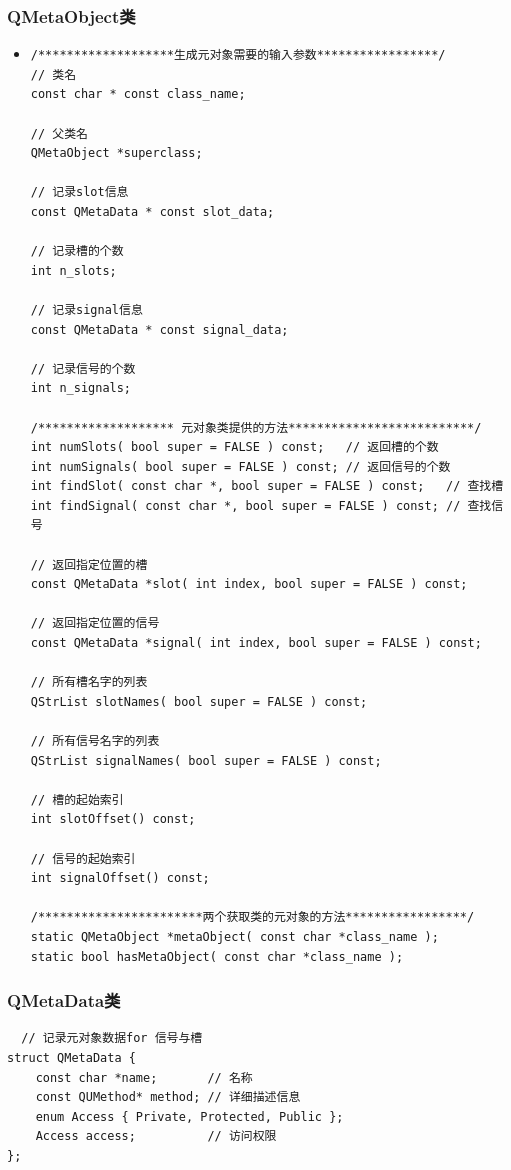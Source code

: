 \documentclass[9pt,b5paper]{article}
\begin{document}
\subsubsection{QMetaObject类}
\label{sec-4-1-1}
\begin{itemize}
\item \lstset{language=java,label= ,caption= ,numbers=none}
\begin{lstlisting}
/*******************生成元对象需要的输入参数*****************/  
// 类名  
const char * const class_name;  

// 父类名  
QMetaObject *superclass;  

// 记录slot信息  
const QMetaData * const slot_data;   

// 记录槽的个数  
int n_slots;  

// 记录signal信息  
const QMetaData * const signal_data;  

// 记录信号的个数  
int n_signals;

/******************* 元对象类提供的方法**************************/  
int numSlots( bool super = FALSE ) const;   // 返回槽的个数  
int numSignals( bool super = FALSE ) const; // 返回信号的个数  
int findSlot( const char *, bool super = FALSE ) const;   // 查找槽  
int findSignal( const char *, bool super = FALSE ) const; // 查找信号  

// 返回指定位置的槽  
const QMetaData *slot( int index, bool super = FALSE ) const;  

// 返回指定位置的信号  
const QMetaData *signal( int index, bool super = FALSE ) const;  

// 所有槽名字的列表  
QStrList slotNames( bool super = FALSE ) const;  

// 所有信号名字的列表  
QStrList signalNames( bool super = FALSE ) const;  

// 槽的起始索引  
int slotOffset() const;  

// 信号的起始索引  
int signalOffset() const;  

/***********************两个获取类的元对象的方法*****************/  
static QMetaObject *metaObject( const char *class_name );  
static bool hasMetaObject( const char *class_name );
\end{lstlisting}
\end{itemize}
\subsubsection{QMetaData类}
\label{sec-4-1-2}
\lstset{language=java,label= ,caption= ,numbers=none}
\begin{lstlisting}
  // 记录元对象数据for 信号与槽  
struct QMetaData {                                   
    const char *name;       // 名称  
    const QUMethod* method; // 详细描述信息  
    enum Access { Private, Protected, Public };  
    Access access;          // 访问权限  
};
\end{lstlisting}
\end{document}
